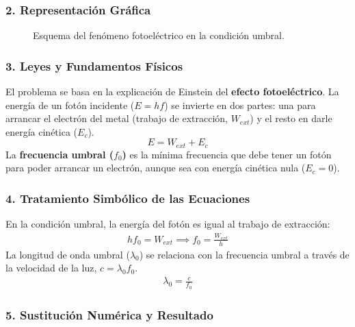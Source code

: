 \subsubsection*{2. Representación Gráfica}
\begin{figure}[H]
    \centering
    \caption{Esquema del fenómeno fotoeléctrico en la condición umbral.}
\end{figure}

\subsubsection*{3. Leyes y Fundamentos Físicos}
El problema se basa en la explicación de Einstein del \textbf{efecto fotoeléctrico}. La energía de un fotón incidente ($E=hf$) se invierte en dos partes: una para arrancar el electrón del metal (trabajo de extracción, $W_{ext}$) y el resto en darle energía cinética ($E_c$).
$$ E = W_{ext} + E_c $$
La \textbf{frecuencia umbral ($f_0$)} es la mínima frecuencia que debe tener un fotón para poder arrancar un electrón, aunque sea con energía cinética nula ($E_c=0$).

\subsubsection*{4. Tratamiento Simbólico de las Ecuaciones}
En la condición umbral, la energía del fotón es igual al trabajo de extracción:
\begin{gather}
    h f_0 = W_{ext} \implies f_0 = \frac{W_{ext}}{h}
\end{gather}
La longitud de onda umbral ($\lambda_0$) se relaciona con la frecuencia umbral a través de la velocidad de la luz, $c = \lambda_0 f_0$.
\begin{gather}
    \lambda_0 = \frac{c}{f_0}
\end{gather}

\subsubsection*{5. Sustitución Numérica y Resultado}
